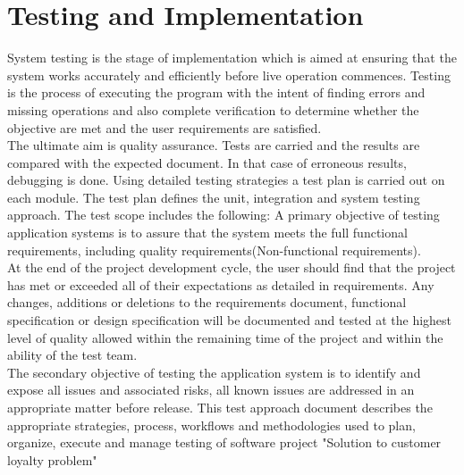 \chapter{Testing and Implementation}
\par
System testing is the stage of implementation which is aimed at ensuring that
the system works accurately and efficiently before live operation commences.
Testing is the process of executing the program with the intent of finding
errors and missing operations and also complete verification to determine
whether the objective are met and the user requirements are satisfied.\\

The ultimate aim is quality assurance. Tests are carried and the results are
compared with the expected document. In that case of erroneous results, debugging
is done. Using detailed testing strategies a test plan is carried out on each
module. The test plan defines the unit, integration and system testing approach.
The test scope includes the following: A primary objective of testing
application systems is to assure that the system meets the full functional
requirements, including quality requirements(Non-functional requirements).\\

At the end of the project development cycle, the user should find that the
project has met or exceeded all of their expectations as detailed in
requirements. Any changes, additions or deletions to the requirements document,
functional specification or design specification will be documented and tested
at the highest level of quality allowed within the remaining time of the
project and within the ability of the test team.\\

The secondary objective of testing the application system is to identify and
expose all issues and associated risks, all known issues are
addressed in an appropriate matter before release. This test approach document
describes the appropriate strategies, process, workflows and methodologies
used to plan, organize, execute and manage testing of software project
"Solution to customer loyalty problem"

\newpage

